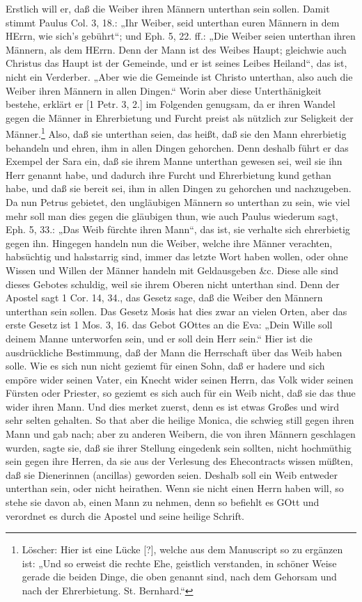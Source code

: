 Erstlich will er, daß die Weiber ihren Männern unterthan sein sollen. Damit stimmt Paulus Col. 3, 18.: „Ihr Weiber, seid unterthan euren Männern in dem HErrn, wie sich’s gebührt“; und Eph. 5, 22. ff.: „Die Weiber seien unterthan ihren Männern, als dem HErrn. Denn der Mann ist des Weibes Haupt; gleichwie auch Christus das Haupt ist der Gemeinde, und er ist seines Leibes Heiland“, das ist, nicht ein Verderber. „Aber wie die Gemeinde ist Christo unterthan, also auch die Weiber ihren Männern in allen Dingen.“ Worin aber diese Unterthänigkeit bestehe, erklärt er [1 Petr. 3, 2.] im Folgenden genugsam, da er ihren Wandel gegen die Männer in Ehrerbietung und Furcht preist als nützlich zur Seligkeit der Männer.\footnote{Löscher: Hier ist eine Lücke [?], welche aus dem Manuscript so zu ergänzen ist: „Und so erweist die rechte Ehe, geistlich verstanden, in schöner Weise gerade die beiden Dinge, die oben genannt sind, nach dem Gehorsam und nach der Ehrerbietung. St. Bernhard.“} Also, daß sie unterthan seien, das heißt, daß sie den Mann ehrerbietig behandeln und ehren, ihm in allen Dingen gehorchen. Denn deshalb führt er das Exempel der Sara ein, daß sie ihrem Manne unterthan gewesen sei, weil sie ihn Herr genannt habe, und dadurch ihre Furcht und Ehrerbietung kund gethan habe, und daß sie bereit sei, ihm in allen Dingen zu gehorchen und nachzugeben. Da nun Petrus gebietet, den ungläubigen Männern so unterthan zu sein, wie viel mehr soll man dies gegen die gläubigen thun, wie auch Paulus wiederum sagt, Eph. 5, 33.: „Das Weib fürchte ihren Mann“, das ist, sie
verhalte sich ehrerbietig gegen ihn. Hingegen handeln nun die Weiber, welche ihre Männer verachten, habsüchtig und halsstarrig sind, immer das letzte Wort haben wollen, oder ohne Wissen und Willen der Männer handeln mit Geldausgeben \&c. Diese alle sind dieses Gebotes schuldig, weil sie ihrem Oberen nicht unterthan sind. Denn der Apostel sagt 1 Cor. 14, 34., das Gesetz sage, daß die Weiber den Männern unterthan sein sollen. Das Gesetz Mosis hat dies zwar an vielen Orten, aber das erste Gesetz ist 1 Mos. 3, 16. das Gebot GOttes an die Eva: „Dein Wille soll deinem Manne unterworfen sein, und er soll dein Herr sein.“ Hier ist die ausdrückliche Bestimmung, daß der Mann die Herrschaft über das Weib haben solle. Wie es sich nun nicht geziemt für einen Sohn, daß er hadere und sich empöre wider seinen Vater, ein Knecht wider seinen Herrn, das Volk wider seinen Fürsten oder Priester, so geziemt es sich auch für ein Weib nicht, daß sie das thue wider ihren Mann. Und dies merket zuerst, denn es ist etwas Großes und wird sehr selten gehalten. So that aber die heilige Monica, die schwieg still gegen ihren Mann und gab nach; aber zu anderen Weibern, die von ihren Männern geschlagen wurden, sagte sie, daß sie ihrer Stellung eingedenk sein sollten, nicht hochmüthig sein gegen ihre Herren, da sie aus der Verlesung des Ehecontracts wissen müßten, daß sie Dienerinnen (ancillas) geworden seien. Deshalb soll ein Weib entweder unterthan sein, oder nicht heirathen. Wenn sie nicht einen Herrn haben will, so stehe sie davon ab, einen Mann zu nehmen, denn so befiehlt es GOtt und verordnet es durch die Apostel und seine heilige Schrift.


